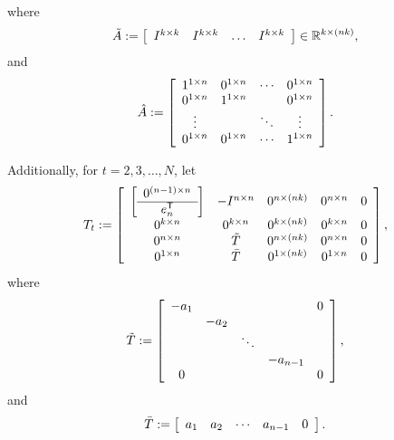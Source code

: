 where
\begin{equation*}
\tilde{A} :=\left[
\begin{array}{cccc}
	I^{k\times k} & I^{k\times k} & \ldots &I^{k\times k}
\end{array}
\right] \in {\mathbb R}^{k\times (nk)},
\end{equation*}
and 
\begin{equation*}
\hat{A} := \left[
\begin{array}{cccc}
	1^{1\times n}	& 0^{1\times n}	& \cdots & 0^{1\times n}\\
	0^{1\times n}   & 1^{1\times n} &		& 0^{1\times n}\\
	\vdots			&				& \ddots	& \vdots	\\
	0^{1\times n}	& 0^{1\times n} & \cdots & 1^{1\times n}
\end{array}
\right].
\end{equation*}

Additionally, for $t = 2,3,\ldots, N$, let
\begin{equation*}
T_t := \left[
\begin{array}{ccccc}
	\left[
	\begin{array}{c}
		0^{(n-1)\times n}\\ \hline
		e_n^{\mbox{\scriptsize\sf T}}
	\end{array}
	\right]		& -I^{n\times n}	& 	0^{n\times (nk)}	& 0^{n\times n} & 0\\
0^{k\times n}	& 0^{k\times n}	& 0^{k\times (nk)}	& 0^{k\times n} & 0\\
0^{n\times n}	& \tilde{T}		& 0^{n\times (nk)}	& 0^{n\times n} & 0\\
0^{1\times n}	& \bar{T}		& 0^{1\times (nk)}	& 0^{1\times n}	& 0
\end{array}
\right],
\end{equation*}
where
\begin{equation*}
\tilde{T} := \left[
\begin{array}{ccccc}
	-a_1	&	&	&	& 0\\
	&	-a_2	&	&	&	\\
	&	&\ddots	&	&	\\
	&	&	&	-a_{n-1}	&\\
	0	&	&	&	&	0
\end{array}
\right],
\end{equation*}
and
\begin{equation*}
\bar{T} := \left[
\begin{array}{ccccc}
	a_1	& a_2	& \cdots	& a_{n-1}	& 0
\end{array}
\right].
\end{equation*}

